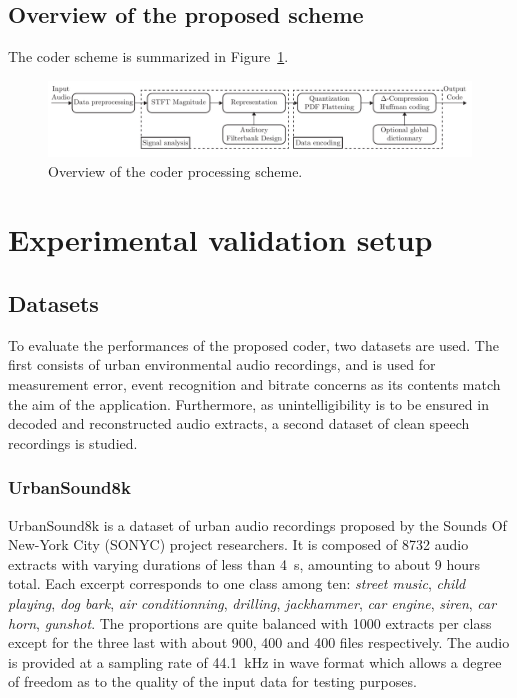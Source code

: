 \documentclass[12pt,times,onecolumn]{article}
\begin{document}
\subsection{Overview of the proposed scheme}
The coder scheme is summarized in Figure~\ref{fig:scheme}.

\begin{figure}[htbp]
	\centering
		\includegraphics[width=1\textwidth]{figures/scheme.pdf}
	\caption{Overview of the coder processing scheme.}
	\label{fig:scheme}
\end{figure}
\section{Experimental validation setup}

\subsection{Datasets}
To evaluate the performances of the proposed coder, two datasets are used. The first consists of urban environmental audio recordings, and is used for measurement error, event recognition and bitrate concerns as its contents match the aim of the application. Furthermore, as unintelligibility is to be ensured in decoded and reconstructed audio extracts, a second dataset of clean speech recordings is studied.

\subsubsection{UrbanSound8k}
UrbanSound8k \cite{salamon2014} is a dataset of urban audio recordings proposed by the Sounds Of New-York City (SONYC) project researchers. It is composed of 8732 audio extracts with varying durations of less than 4~s, amounting to about 9 hours total. Each excerpt corresponds to one class among ten: \textit{street music}, \textit{child playing}, \textit{dog bark}, \textit{air conditionning}, \textit{drilling}, \textit{jackhammer}, \textit{car engine}, \textit{siren}, \textit{car horn}, \textit{gunshot}. The proportions are quite balanced with 1000 extracts per class except for the three last with about 900, 400 and 400 files respectively. The audio is provided at a sampling rate of 44.1~kHz in wave format which allows a degree of freedom as to the quality of the input data for testing purposes.\\
\end{document}
